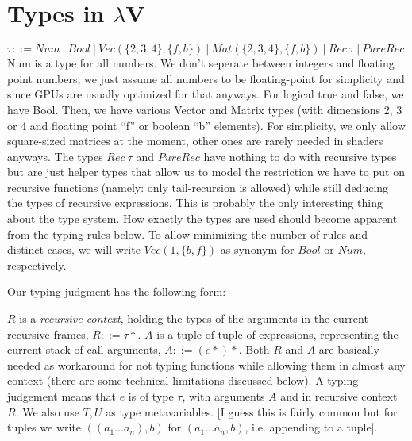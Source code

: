 \documentclass[letterpaper,12pt]{article}
\begin{document}
\section{Types in $\lambda$V}

$\tau ::= Num \:|\: 
	Bool \:|\: 
	Vec(\{2, 3, 4\}, \{f, b\}) \:|\: 
	Mat(\{2, 3, 4\}, \{f, b\}) \:|\: 
	Rec\:\tau \:|\: 
	PureRec$ \\

Num is a type for all numbers. We don't seperate between integers and floating
point numbers, we just assume all numbers to be floating-point for simplicity
and since GPUs are usually optimized for that anyways. For logical true and
false, we have Bool. Then, we have various Vector and Matrix types (with
dimensions 2, 3 or 4 and floating point ``f'' or boolean ``b'' elements).
For simplicity, we only allow square-sized matrices at the moment, other
ones are rarely needed in shaders anyways. 
The types $Rec\: \tau$ and $PureRec$ have nothing to do with
recursive types but are just helper types that
allow us to model the restriction we have to put on recursive functions
(namely: only tail-recursion is allowed) while still deducing the types of
recursive expressions. This is probably the only interesting thing about
the type system. How exactly the types are used should become apparent from
the typing rules below.
To allow minimizing the number of rules and distinct cases, we will
write $Vec(1, \{b,f\})$ as synonym for $Bool$ or $Num$, respectively.

Our typing judgment has the following form: \\
\begin{center}
\end{center}

$R$ is a \textit{recursive context}, holding the types of the
arguments in the current recursive frames, $R ::= \tau*$.
$A$ is a tuple of tuple of expressions, representing the current
stack of call arguments, $A ::= (e*)*$.
Both $R$ and $A$ are basically needed as workaround for not typing
functions while allowing them in almost any context (there are some
technical limitations discussed below).
A typing judgement means that $e$ is of type $\tau$, with arguments
$A$ and in recursive context $R$.
We also use $T, U$ as type metavariables.
[I guess this is fairly common but for tuples we write $((a_1 \dots a_n), b)$
for $(a_1 \dots a_n, b)$, i.e. appending to a tuple].
\end{document}
